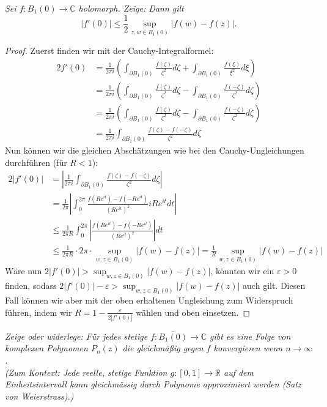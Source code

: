 \documentclass[11pt]{article}
\newcommand{\R}{\mathbb{R}}
\newcommand{\C}{\mathbb{C}}
\newenvironment{problem}[2][Beispiel]{
    \begin{trivlist}
        \item[\hskip \labelsep {\bfseries #1}\hskip \labelsep {\bfseries #2.}] \itshape}{
    \end{trivlist}\normalshape
}
\begin{document}
    \begin{problem}{3}
        Sei $f: B_1(0)\to\C$ holomorph. Zeige: Dann gilt
        $$|f'(0)|\leq \frac{1}{2}\sup_{z,w\in B_1(0)} |f(w)-f(z)|.$$
    \end{problem}

    \begin{proof}
        Zuerst finden wir mit der Cauchy-Integralformel:
        $$\begin{aligned}
              2 f'(0) &= \frac{1}{2\pi i}\left(\int_{\partial B_1(0)}\frac{f(\zeta)}{\zeta^2}d\zeta
              +\int_{\partial B_1(0)}\frac{f(\xi)}{\xi^2}d\xi\right)\\
              &= \frac{1}{2\pi i}\left(\int_{\partial B_1(0)}\frac{f(\zeta)}{\zeta^2}d\zeta
              -\int_{\partial B_1(0)}\frac{f(-\zeta)}{\zeta^2}d\zeta\right)\\
              &= \frac{1}{2\pi i}\left(\int_{\partial B_1(0)}\frac{f(\zeta)}{\zeta^2}d\zeta
              -\int_{\partial B_1(0)}\frac{f(-\zeta)}{\zeta^2}d\zeta\right)\\
              &= \frac{1}{2\pi i}\int_{\partial B_1(0)}\frac{f(\zeta)-f(-\zeta)}{\zeta^2}d\zeta
        \end{aligned}$$
        Nun können wir die gleichen Abschätzungen wie bei den Cauchy-Ungleichungen durchführen (für $R<1$):
        $$\begin{aligned}
              2|f'(0)|
              &= \left|\frac{1}{2\pi i}\int_{\partial B_1(0)}\frac{f(\zeta)-f(-\zeta)}{\zeta^2}d\zeta\right|\\
              &= \frac{1}{2\pi}\left|\int_{0}^{2\pi}\frac{f(Re^{it})-f(-Re^{it})}{(Re^{it})^2}iRe^{it}dt\right|\\
              &\leq \frac{1}{2\pi R}\int_{0}^{2\pi}\left|\frac{f(Re^{it})-f(-Re^{it})}{(Re^{it})^2}\right|dt\\
              &\leq \frac{1}{2\pi R}\cdot 2\pi \cdot \sup_{w,z\in B_1(0)}|f(w)-f(z)| = \frac{1}{R}\sup_{w,z\in B_1(0)}|f(w)-f(z)|
        \end{aligned}$$
        Wäre nun $2|f'(0)|>\sup_{w,z\in B_1(0)}|f(w)-f(z)|$, könnten wir ein $\varepsilon>0$ finden, sodass
        $2|f'(0)|-\varepsilon>\sup_{w,z\in B_1(0)}|f(w)-f(z)|$ auch gilt. Diesen Fall können wir
        aber mit der oben erhaltenen Ungleichung zum Widerspruch führen, indem wir
        $R = 1- \frac{\varepsilon}{2|f'(0)|}$ wählen und oben einsetzen.
    \end{proof}

    \begin{problem}{4}
        Zeige oder widerlege: Für jedes stetige $f: \overline{B_1(0)}\to\C$ gibt es eine Folge von
        komplexen Polynomen $P_n(z)$ die gleichmäßig gegen $f$ konvergieren wenn $n\to\infty$.\\
        (Zum Kontext: Jede reelle, stetige Funktion $g : [0, 1] \to \R$ auf dem Einheitsintervall kann
        gleichmässig durch Polynome approximiert werden (Satz von Weierstrass).)
    \end{problem}
\end{document}
